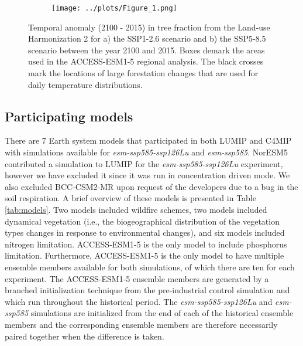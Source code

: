 \documentclass[]{article}
\begin{document}
\begin{figure}[H]
    \centering
    \begin{subfigure}[b]{\linewidth}
        \texttt{[image: ../plots/Figure\_1.png]}
    \end{subfigure}
    \caption{Temporal anomaly (2100 - 2015) in tree fraction from the Land-use Harmonization 2 for a) the SSP1-2.6 scenario and b) the SSP5-8.5 scenario between the year 2100 and 2015. Boxes demark the areas used in the ACCESS-ESM1-5 regional analysis. The black crosses mark the locations of large forestation changes that are used for daily temperature distributions.}
    \label{fig:land_use}
\end{figure}

\subsection{Participating models}

There are 7 Earth system models that participated in both LUMIP and C4MIP with simulations available for \textit{esm-ssp585-ssp126Lu} and \textit{esm-ssp585}.
NorESM5 contributed a simulation to LUMIP for the \textit{esm-ssp585-ssp126Lu} experiment, however we have excluded it since it was run in concentration driven mode.
We also excluded BCC-CSM2-MR upon request of the developers due to a bug in the soil respiration.
A brief overview of these models is presented in Table \ref{tab:models}.
Two models included wildfire schemes, two models included dynamical vegetation (i.e., the biogeographical distribution of the vegetation types changes in response to environmental changes), and six models included nitrogen limitation.
ACCESS-ESM1-5 is the only model to include phosphorus limitation.
Furthermore, ACCESS-ESM1-5 is the only model to have multiple ensemble members available for both simulations, of which there are ten for each experiment.
The ACCESS-ESM1-5 ensemble members are generated by a branched initialization technique from the pre-industrial control simulation and which run throughout the historical period.
The \textit{esm-ssp585-ssp126Lu} and \textit{esm-ssp585} simulations are initialized from the end of each of the historical ensemble members and the corresponding ensemble members are therefore necessarily paired together when the difference is taken.
\end{document}
